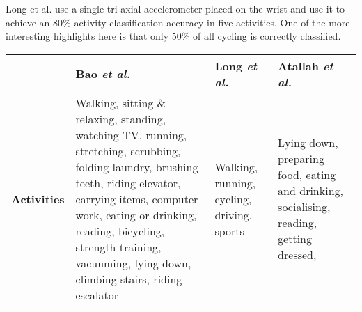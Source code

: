     Long et al. \cite{long2009single} use a single tri-axial accelerometer placed on the wrist and 
    use it to achieve an $80\%$ activity classification accuracy in five activities.  One of the
    more interesting highlights here is that only $50\%$ of all cycling is correctly
    classified.
    \begin{table}[p]
      \setlength\extrarowheight{5pt}
      \begin{tabu} to 
        \hline
          & \textbf{Bao \emph{et al.} \cite{bao2004activity}}
          & \textbf{Long \emph{et al.} \cite{long2009single}}
          & \textbf{Atallah \emph{et al.} \cite{atallah2010sensor}} \\
        \hline
          \textbf{Activities}
          & Walking, \newline sitting \& relaxing, \newline standing, \newline watching TV,
              \newline running, \newline stretching, \newline scrubbing, \newline folding laundry, 
              \newline brushing teeth, \newline riding elevator, \newline carrying items, 
              \newline computer work, \newline eating or drinking, \newline reading, 
              \newline bicycling, \newline strength-training, \newline vacuuming, 
              \newline lying down, \newline climbing stairs, \newline riding escalator
          & Walking, \newline running, \newline cycling, \newline driving, \newline sports
          & Lying down, \newline preparing food, \newline eating and drinking, 
              \newline socialising, \newline reading, \newline getting dressed, 

\end{tabu}
\end{table}
